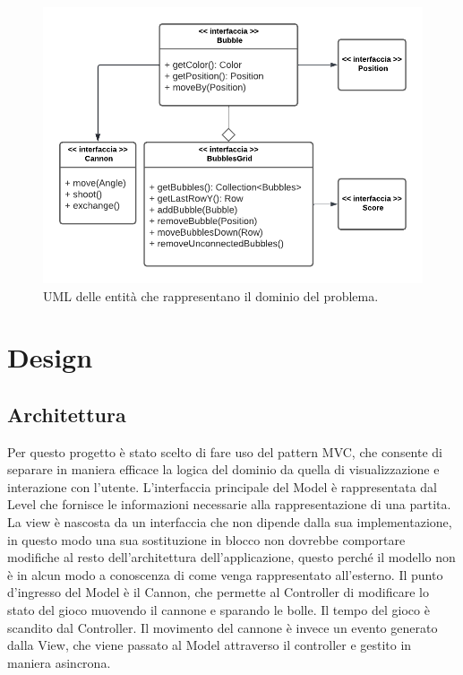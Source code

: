 \documentclass[a4paper,12pt]{report}
\begin{document}
\begin{figure}[H]
	\centering{}
	\includegraphics{img/analysis.pdf}
	\caption{UML delle entità che rappresentano il dominio del problema.}
	\label{img:analysis}
\end{figure}

\chapter{Design}

\section{Architettura}

Per questo progetto è stato scelto di fare uso del pattern MVC, che consente di separare in maniera efficace la logica del dominio da quella di visualizzazione e interazione con l'utente.
L'interfaccia principale del Model è rappresentata dal Level che fornisce le informazioni necessarie alla rappresentazione di una partita. La view è nascosta da un interfaccia che non dipende dalla sua
implementazione, in questo modo una sua sostituzione in blocco non dovrebbe comportare modifiche al resto dell'architettura dell'applicazione, questo perché il modello non è in alcun modo a conoscenza
di come venga rappresentato all'esterno.
%
Il punto d'ingresso del Model è il Cannon, che permette al Controller di modificare lo stato del gioco muovendo il cannone e sparando le bolle.
Il tempo del gioco è scandito dal Controller. Il movimento del cannone è invece un evento generato dalla View, che viene passato al Model attraverso il controller e gestito in maniera asincrona.
\end{document}
